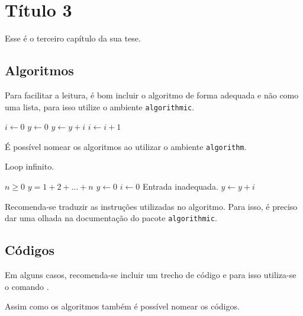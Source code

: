 \chapter{Título 3}
Esse é o terceiro capítulo da sua tese.

\section{Algoritmos}
Para facilitar a leitura, é bom incluir o algoritmo de forma
adequada e não como uma lista, para isso utilize o ambiente
\lstinline+algorithmic+.
\begin{algorithmic}[2]
  \STATE $i \leftarrow 0$
  \STATE $y \leftarrow 0$
    \STATE $y \leftarrow y + i$
    \STATE $i \leftarrow i + 1$
  \ENDFOR
\end{algorithmic}

É possível nomear os algoritmos ao utilizar o ambiente
\lstinline+algorithm+.
\begin{algorithm}
  \caption{Loop infinito.}
  \label{alg:loop_inf}
  \begin{algorithmic}
    \REQUIRE $n \geq 0$
    \ENSURE $y = 1 + 2 + \ldots + n$
    \STATE $y \leftarrow 0$
    \STATE $i \leftarrow 0$
      \PRINT Entrada inadequada.
    \ELSE
        \STATE $y \leftarrow y + i$
      \ENDWHILE
    \ENDIF
  \end{algorithmic}
\end{algorithm}

Recomenda-se traduzir as instruções utilizadas no algoritmo. Para isso, é
preciso dar uma olhada na documentação do pacote \lstinline+algorithmic+.

\section{Códigos}
Em alguns casos, recomenda-se incluir um trecho de
código e para isso utiliza-se o comando
\lstinline++.


Assim como os algoritmos também é possível nomear os códigos.
